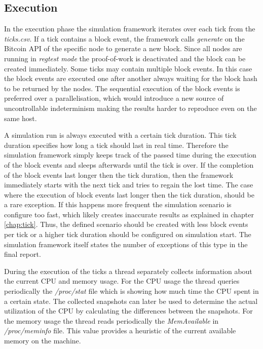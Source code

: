 \subsection{Execution}
\label{chap:simulation_execution}

In the execution phase the simulation framework iterates over each tick from the \textit{ticks.csv}.
If a tick contains a block event, the framework calls \textit{generate} on the Bitcoin API of the specific node to generate a new block.
Since all nodes are running in \textit{regtest mode} the proof-of-work is deactivated and the block can be created immediately.
Some ticks may contain multiple block events.
In this case the block events are executed one after another always waiting for the block hash to be returned by the nodes.
The sequential execution of the block events is preferred over a parallelisation, which would introduce a new source of uncontrollable indeterminism making the results harder to reproduce even on the same host.

A simulation run is always executed with a certain tick duration.
This tick duration specifies how long a tick should last in real time.
Therefore the simulation framework simply keeps track of the passed time during the execution of the block events and sleeps afterwards until the tick is over.
If the completion of the block events last longer then the tick duration, then the framework immediately starts with the next tick and tries to regain the lost time.
The case where the execution of block events last longer then the tick duration, should be a rare exception.
If this happens more frequent the simulation scenario is configure too fast, which likely creates inaccurate results as explained in chapter \ref{chap:tick}.
Thus, the defined scenario should be created with less block events per tick or a higher tick duration should be configured on simulation start.
The simulation framework itself states the number of exceptions of this type in the final report.

During the execution of the ticks a thread separately collects information about the current CPU and memory usage.
For the CPU usage the thread queries periodically the \textit{/proc/stat} file which is showing how much time the CPU spent in a certain state. 
The collected snapshots can later be used to determine the actual utilization of the CPU by calculating the differences between the snapshots.
For the memory usage the thread reads periodically the \textit{MemAvailable} in \textit{/proc/meminfo} file.
This value provides a heuristic of the current available memory on the machine.

